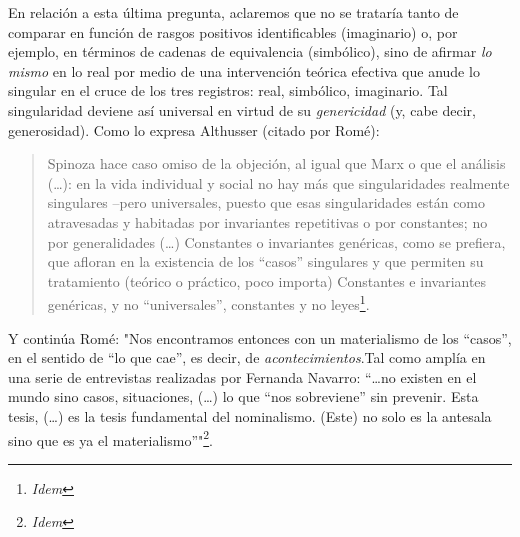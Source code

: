 En relación a esta última pregunta, aclaremos que no se trataría tanto
de comparar en función de rasgos positivos identificables (imaginario)
o, por ejemplo, en términos de cadenas de equivalencia (simbólico), sino
de afirmar \emph{lo mismo} en lo real por medio de una intervención
teórica efectiva que anude lo singular en el cruce de los tres
registros: real, simbólico, imaginario. Tal singularidad deviene así
universal en virtud de su \emph{genericidad} (y, cabe decir,
generosidad). Como lo expresa Althusser (citado por Romé):

\begin{quote}
Spinoza hace caso omiso de la objeción, al igual que Marx o que el
análisis (\ldots): en la vida individual y social no hay más que
singularidades realmente singulares --pero universales, puesto que esas
singularidades están como atravesadas y habitadas por invariantes
repetitivas o por constantes; no por generalidades (\ldots) Constantes o
invariantes genéricas, como se prefiera, que afloran en la existencia de
los ``casos'' singulares y que permiten su tratamiento (teórico o
práctico, poco importa) Constantes e invariantes genéricas, y no
``universales'', constantes y no leyes\footnote{\emph{Idem}}.
\end{quote}

Y continúa Romé: "Nos encontramos entonces con un materialismo de los
``casos'', en el sentido de ``lo que cae'', es decir, de
\emph{acontecimientos}.Tal como amplía en una serie de entrevistas
realizadas por Fernanda Navarro: ``\ldots no existen en el mundo sino
casos, situaciones, (\ldots) lo que ``nos sobreviene'' sin prevenir.
Esta tesis, (\ldots) es la tesis fundamental del nominalismo. (Este) no
solo es la antesala sino que es ya el materialismo''"\footnote{\emph{Idem}}.

